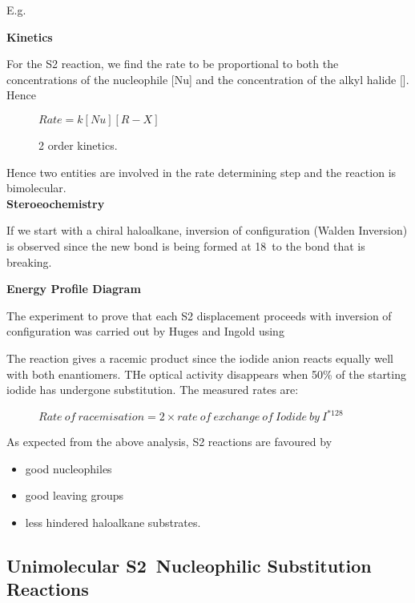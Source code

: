 
E.g.


\textbf{Kinetics}

For the S2 reaction, we find the rate to be proportional to both the
concentrations of the nucleophile [Nu] and the concentration of the alkyl halide
[]. Hence

\begin{figure}[H]
  \centering
  $Rate = k[Nu][R-X]$
  \caption*{2 order kinetics.}
\end{figure}

Hence two entities are involved in the rate determining step and the reaction is
bimolecular.\\

\textbf{Steroeochemistry}

If we start with a chiral haloalkane, inversion of configuration (Walden Inversion)
is observed since the new bond is being formed at 18\de\ to the bond that is breaking.


\textbf{Energy Profile Diagram}


The experiment to prove that each S2 displacement proceeds with inversion
of configuration was carried out by Huges and Ingold using 


The reaction gives a racemic product since the iodide anion  reacts
equally well with both enantiomers. THe optical activity disappears when 50\%
of the starting iodide has undergone substitution. The measured rates are:

\begin{figure}[H]
  \centering
  $Rate\ of\ racemisation = 2 \times rate\ of\ exchange\ of\ Iodide\ by\ I^{*128}$
\end{figure}



As expected from the above analysis, S2 reactions are favoured by
\begin{itemize}
  \item good nucleophiles
  \item good leaving groups
  \item less hindered haloalkane substrates.
\end{itemize}

\subsection{Unimolecular \texorpdfstring{S2}\ \ Nucleophilic Substitution Reactions}

